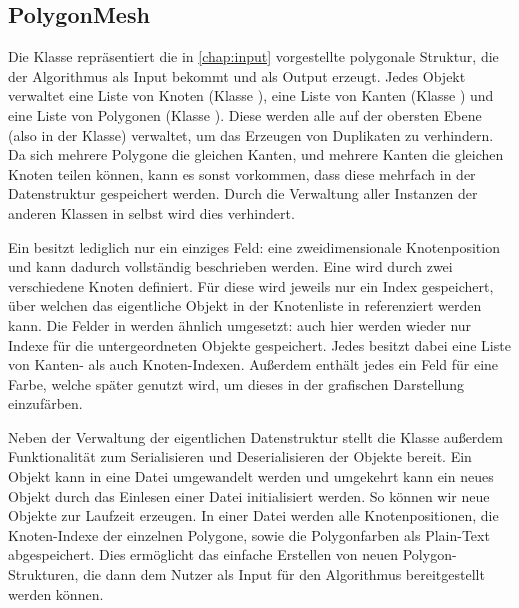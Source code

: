 \subsection{PolygonMesh}
Die  Klasse repräsentiert die in \autoref{chap:input} vorgestellte polygonale Struktur, die der Algorithmus
als Input bekommt und als Output erzeugt. Jedes  Objekt verwaltet eine Liste von Knoten (Klasse ),
eine Liste von Kanten (Klasse ) und eine Liste von Polygonen (Klasse ). Diese werden alle auf der
obersten Ebene (also in der  Klasse) verwaltet, um das Erzeugen von Duplikaten zu verhindern. Da sich
mehrere Polygone die gleichen Kanten, und mehrere Kanten die gleichen Knoten teilen können, kann es sonst vorkommen, dass diese mehrfach
in der Datenstruktur gespeichert werden. Durch die Verwaltung aller Instanzen der anderen Klassen in  selbst wird
dies verhindert.

Ein  besitzt lediglich nur ein einziges Feld: eine zweidimensionale Knotenposition und kann dadurch vollständig
beschrieben werden. Eine  wird durch zwei verschiedene Knoten definiert. Für diese wird jeweils nur ein Index gespeichert,
über welchen das eigentliche  Objekt in der Knotenliste in  referenziert werden kann. Die Felder in
 werden ähnlich umgesetzt: auch hier werden wieder nur Indexe für die untergeordneten Objekte gespeichert. Jedes
 besitzt dabei eine Liste von Kanten- als auch Knoten-Indexen. Außerdem enthält jedes  ein Feld
für eine Farbe, welche später genutzt wird, um dieses in der grafischen Darstellung einzufärben.

Neben der Verwaltung der eigentlichen Datenstruktur stellt die  Klasse außerdem Funktionalität zum Serialisieren
und Deserialisieren der Objekte bereit. Ein  Objekt kann in eine  Datei umgewandelt werden und umgekehrt
kann ein neues  Objekt durch das Einlesen einer  Datei initialisiert werden. So können wir neue
 Objekte zur Laufzeit erzeugen. In einer  Datei werden alle Knotenpositionen, die Knoten-Indexe der einzelnen
Polygone, sowie die Polygonfarben als Plain-Text abgespeichert. Dies ermöglicht das einfache Erstellen von neuen Polygon-Strukturen, die
dann dem Nutzer als Input für den Algorithmus bereitgestellt werden können.

